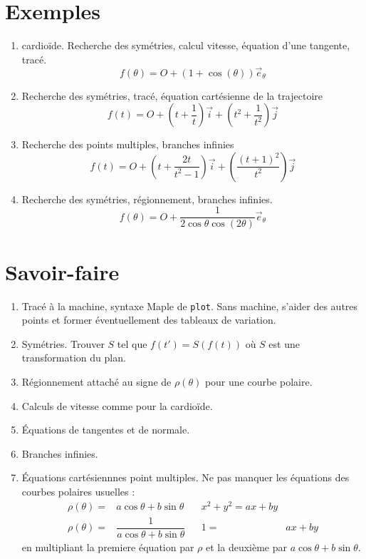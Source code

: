 \section{Exemples}
\begin{enumerate}
\item cardioïde. Recherche des symétries, calcul vitesse, équation d'une tangente, tracé.
\begin{displaymath}
 f(\theta)= O +(1+\cos(\theta))\overrightarrow{e}_\theta
\end{displaymath}

 \item Recherche des symétries, tracé, équation cartésienne de la trajectoire
\begin{displaymath}
 f(t)= O+(t+\frac{1}{t})\overrightarrow{i} + (t^2+\frac{1}{t^2})\overrightarrow{j} 
\end{displaymath}

\item Recherche des points multiples, branches infinies
\begin{displaymath}
 f(t)= O+(t+\frac{2t}{t^2-1})\overrightarrow{i} + (\frac{(t+1)^2}{t^2})\overrightarrow{j} 
\end{displaymath}

\item Recherche des symétries, régionnement, branches infinies.
\begin{displaymath}
 f(\theta)= O +\dfrac{1}{2\cos\theta\cos(2\theta)}\overrightarrow{e}_\theta
\end{displaymath}
\end{enumerate}

\section{Savoir-faire}
\begin{enumerate}
 \item Tracé à la machine, syntaxe Maple de \verb|plot|. Sans machine, s'aider des autres points et former éventuellement des tableaux de variation.
\item Symétries. Trouver $S$ tel que $f(t')=S(f(t))$ où $S$ est une transformation du plan.
\item Régionnement attaché au signe de $\rho(\theta)$ pour une courbe polaire.
\item Calculs de vitesse comme pour la cardioïde.
\item \'Equations de tangentes et de normale.
\item Branches infinies.
\item \'Equations cartésiennnes point multiples. Ne pas manquer les équations des courbes polaires usuelles :
\begin{align*}
 \rho(\theta) =& a\cos\theta + b\sin \theta & & x^2+y^2 = ax +by \\
\rho(\theta) =& \dfrac{1}{a\cos\theta + b\sin \theta} & & 1=& ax +by
\end{align*}
en multipliant la premiere équation par $\rho$ et la deuxième par $a\cos \theta +b\sin\theta$.
\end{enumerate}



